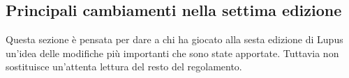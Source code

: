 \documentclass[a4paper,10pt]{article}
\begin{document}
% 
% 
% 
% 

 \subsection{Principali cambiamenti nella settima edizione}
 
 Questa sezione è pensata per dare a chi ha giocato alla sesta edizione di Lupus un'idea delle modifiche più importanti che sono state apportate. Tuttavia non sostituisce un'attenta lettura del resto del regolamento.
 
\end{document}
